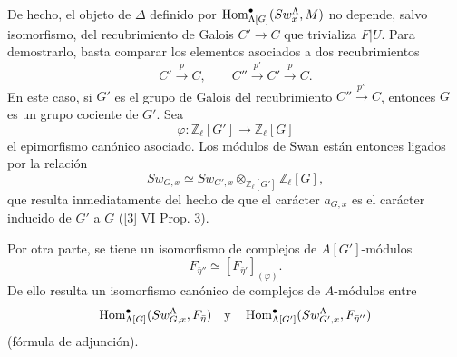 De hecho, el objeto de $\Delta$ definido por $\operatorname{Hom}^\bullet_{\Lambda[G]}(Sw_x^\Lambda,M)$ no depende, salvo isomorfismo, del recubrimiento de Galois $C'\to C$ que trivializa $F|U$. Para demostrarlo, basta comparar los elementos asociados a dos recubrimientos
\[
C'\xrightarrow{p}C,\qquad C''\xrightarrow{p'}C'\xrightarrow{p}C.
\]
En este caso, si $G'$ es el grupo de Galois del recubrimiento $C''\xrightarrow{p''}C$, entonces $G$ es un grupo cociente de $G'$. Sea
\[
\varphi:\mathbb Z_\ell[G']\longrightarrow \mathbb Z_\ell[G]
\]
el epimorfismo canónico asociado. Los módulos de Swan están entonces ligados por la relación
\[
Sw_{G,x}\simeq Sw_{G',x}\otimes_{\mathbb Z_\ell[G']}\mathbb Z_\ell[G],
\]
que resulta inmediatamente del hecho de que el carácter $a_{G,x}$ es el carácter inducido de $G'$ a $G$ ([3] VI Prop. 3).

Por otra parte, se tiene un isomorfismo de complejos de $A[G']$-módulos
\[
F_{\bar\eta''}\simeq [F_{\bar\eta'}]_{(\varphi)}.
\]
De ello resulta un isomorfismo canónico de complejos de $A$-módulos entre
\[
\operatorname{Hom}^\bullet_{\Lambda[G]}(Sw_{G,x}^\Lambda,F_{\bar\eta})
\quad\text{y}\quad
\operatorname{Hom}^\bullet_{\Lambda[G']}(Sw_{G',x}^\Lambda,F_{\bar\eta''})
\]
(fórmula de adjunción).
